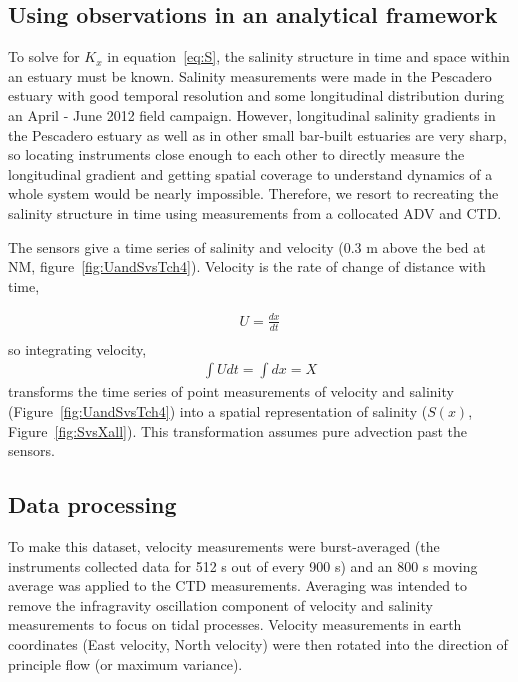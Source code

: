 \subsection{Using observations in an analytical framework} \label{ssec:ObsInto1DAdvDiff}
To solve for $K_x$ in equation~\ref{eq:S}, the salinity structure in time and space within an estuary must be known. Salinity measurements were made in the Pescadero estuary with good temporal resolution and some longitudinal distribution during an April - June 2012 field campaign. However, longitudinal salinity gradients in the Pescadero estuary as well as in other small bar-built estuaries are very sharp, so locating instruments close enough to each other to directly measure the longitudinal gradient and getting spatial coverage to understand dynamics of a whole system would be nearly impossible. Therefore, we resort to recreating the salinity structure in time using measurements from a collocated ADV and CTD. 

The sensors give a time series of salinity and velocity (0.3 m above the bed at NM, figure~\ref{fig:UandSvsTch4}). Velocity is the rate of change of distance with time,

\begin{eqnarray}
U = \frac{dx}{dt} \label{eq:uEdxdt}\\
\end{eqnarray}
so integrating velocity,
\begin{eqnarray}
\int{Udt} = \int{dx} = X \label{eq:intuEx}
\end{eqnarray}
transforms the time series of point measurements of velocity and salinity (Figure~\ref{fig:UandSvsTch4}) into a spatial representation of salinity ($S(x)$, Figure~\ref{fig:SvsXall}). This transformation assumes pure advection past the sensors.

\subsection{Data processing} \label{ssec:DataProcessing}
To make this dataset, velocity measurements were burst-averaged (the instruments collected data for 512 s out of every 900 s) and an 800 s moving average was applied to the CTD measurements.  Averaging was intended to remove the infragravity oscillation component of velocity and salinity measurements to focus on tidal processes. Velocity measurements in earth coordinates (East velocity, North velocity) were then rotated into the direction of principle flow (or maximum variance). 


